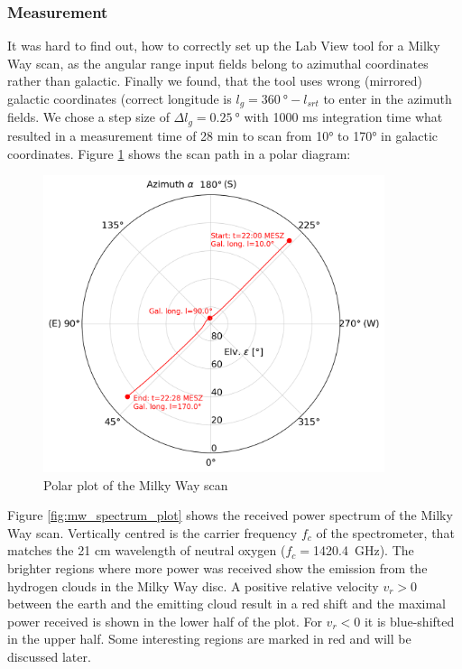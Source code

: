\subsubsection{Measurement}
It was hard to find out, how to correctly set up the Lab View tool for a Milky Way scan, as the angular range input fields belong to azimuthal coordinates rather than galactic. Finally we found, that the tool uses wrong (mirrored) galactic coordinates (correct longitude is $l_g=\SI{360}{\degree}-l_{srt}$ to enter in the azimuth fields. We chose a step size of $\Delta l_g=\SI{0.25}{\degree}$ with 1000 ms integration time what resulted in a measurement time of 28 min to scan from 10° to 170° in galactic coordinates. Figure \ref{fig:mw_scan_polar} shows the scan path in a polar diagram:

\begin{figure}[H]
    \centering
    \includegraphics[width=10cm]{assets/mw_scan_polar.png}
    \caption{Polar plot of the Milky Way scan}
    \label{fig:mw_scan_polar}
\end{figure}

Figure \ref{fig:mw_spectrum_plot} shows the received power spectrum of the Milky Way scan. Vertically centred is the carrier frequency $f_c$ of the spectrometer, that matches the 21 cm wavelength of neutral oxygen ($f_c=$\SI{1420.4}{\giga\hertz}).
The brighter regions where more power was received show the emission from the hydrogen clouds in the Milky Way disc. A positive relative velocity $v_r>0$ between the earth and the emitting cloud result in a red shift and the maximal power received is shown in the lower half of the plot. For $v_r<0$ it is blue-shifted in the upper half. Some interesting regions are marked in red and will be discussed later.


